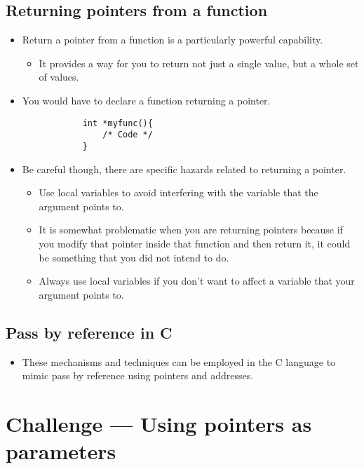\subsection{Returning pointers from a function}
\begin{itemize}
    \item Return a pointer from a function is a particularly powerful capability. 
        \begin{itemize}
            \item It provides a way for you to return not just a single value, but a whole set of values. 
        \end{itemize}
    
    \item You would have to declare a function returning a pointer. 
        \begin{verbatim}
            int *myfunc(){
                /* Code */
            }
        \end{verbatim}
    
    \item Be careful though, there are specific hazards related to returning a pointer.
        \begin{itemize}
            \item Use local variables to avoid interfering with the variable that the argument points to.
            \item  It is somewhat problematic when you are returning pointers because if you modify that pointer inside that function and then return it, it could be something that you did not intend to do.
            \item Always use local variables if you don't want to affect a variable that your argument points to.  
        \end{itemize}
\end{itemize}

\subsection{Pass by reference in C}
\begin{itemize}
    \item These mechanisms and techniques can be employed in the C language to mimic pass by reference using pointers and addresses. 
\end{itemize}

\section{Challenge — Using pointers as parameters}


